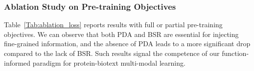 \subsubsection{Ablation Study on Pre-training Objectives}
Table~\ref{Tab:ablation_loss} reports results with full or partial pre-training objectives. We can observe that  both PDA and BSR are essential for injecting fine-grained information, and the absence of PDA leads to a more significant drop compared to the lack of BSR. Such results signal the competence of our function-informed paradigm for protein-biotext multi-modal learning.
\begin{table}[!ht]
    \caption{Analysis on pre-training data. Pretrain+fintune: first pretrained on low accurate data, then fine-tuned on high accurate data. Property-driven sampling strategy: pretrained on \ourdatasetD with the proposed sampling strategy.}
    \vspace{-1em}
    \label{Tab:ablation_data}
    \begin{center}
    \vspace{-1em}
    \end{center}
\end{table}
